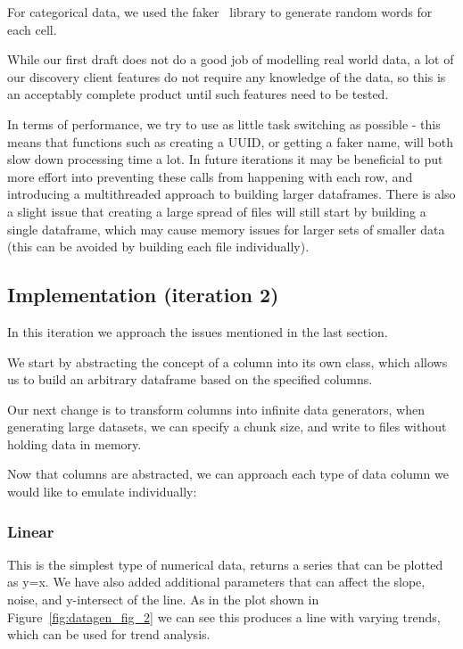 For categorical data, we used the faker~\cite{PythonFaker} library to generate random words for each cell.

While our first draft does not do a good job of modelling real world data, a lot of our discovery client features do not
require any knowledge of the data, so this is an acceptably complete product until such features need to be tested.

In terms of performance, we try to use as little task switching as possible - this means that functions such as creating
a UUID, or getting a faker name, will both slow down processing time a lot.
In future iterations it may be beneficial to put more effort into preventing these calls from happening with each row,
and introducing a multithreaded approach to building larger dataframes.
There is also a slight issue that creating a large spread of files will still start by building a single dataframe, which
may cause memory issues for larger sets of smaller data (this can be avoided by building each file individually).

\subsection{Implementation (iteration 2)}\label{subsec:implementation-(iteration-2)}

In this iteration we approach the issues mentioned in the last section.

We start by abstracting the concept of a column into its own class, which allows us to build an arbitrary dataframe
based on the specified columns.

Our next change is to transform columns into infinite data generators, when generating large datasets, we can specify
a chunk size, and write to files without holding data in memory.

Now that columns are abstracted, we can approach each type of data column we would like to emulate individually:

\subsubsection{Linear}

This is the simplest type of numerical data, returns a series that can be plotted as y=x.
We have also added additional parameters that can affect the slope, noise, and y-intersect of the line.
As in the plot shown in Figure~\ref{fig:datagen_fig_2} we can see this produces a line with varying trends, which can be used
for trend analysis.

